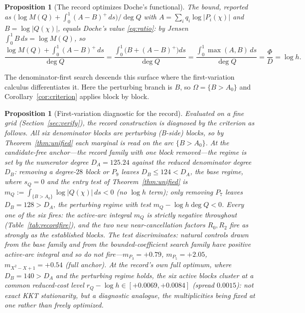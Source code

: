 \documentclass[11pt,reqno]{amsart}
\theoremstyle{plain}
\newtheorem{proposition}[theorem]{Proposition}
\theoremstyle{definition}
\theoremstyle{remark}
\newcommand{\rQ}{r_Q}
\newcommand{\dA}{D_A}
\newcommand{\dB}{D_B}
\begin{document}
\begin{proposition}[The record optimizes Doche's functional]\label{prop:samefunctional}
The \citet{Gri26} bound, reported as
$\bigl(\log M(Q)+\int_0^1(A-B)^+\,ds\bigr)/\deg Q$ with $A=\sum_iq_i\log|P_i(\chi)|$ and
$B=\log|Q(\chi)|$, equals Doche's value \eqref{eq:ratio}: by Jensen
$\int_0^1 B\,ds=\log M(Q)$, so
\begin{equation}\label{eq:samefunctional}
  \frac{\log M(Q)+\int_0^1(A-B)^+\,ds}{\deg Q}
  =\frac{\int_0^1\bigl(B+(A-B)^+\bigr)ds}{\deg Q}
  =\frac{\int_0^1\max(A,B)\,ds}{\deg Q}=\frac{\Phi}{D}=\log h.
\end{equation}
\end{proposition}

The denominator-first search descends this surface where the first-variation calculus
differentiates it. Here the perturbing branch is $B$, so $\Omega=\{B>A_0\}$ and
Corollary~\ref{cor:criterion} applies block by block.

\begin{proposition}[First-variation diagnostic for the record]\label{thm:record-fires}
Evaluated on a fine grid (Section~\ref{sec:verify}), the record construction is
diagnosed by the criterion as follows. All six denominator blocks are \emph{perturbing}
(B-side) blocks, so by Theorem~\ref{thm:unified} each marginal is read on the arc
$\{B>A_0\}$. At the candidate-free anchor---the record family with one block removed---the
regime is set by the numerator degree $\dA=125.24$ against the reduced denominator degree
$\dB$: removing a degree-$28$ block or $P_9$ leaves $\dB\le124<\dA$, the \emph{base}
regime, where $s_Q=0$ and the entry test of Theorem~\ref{thm:unified} is
$m_Q:=\int_{\{B>A_0\}}\log|Q(\chi)|\,ds<0$ (no $\log h$ term); only removing $P_7$ leaves
$\dB=128>\dA$, the perturbing regime with test $m_Q-\log h\deg Q<0$. Every one of the six
fires: the active-arc integral $m_Q$ is strictly negative throughout
(Table~\ref{tab:recordfire}), and the two new near-cancellation factors $R_0,R_2$ fire as
strongly as the established blocks. The test discriminates: natural controls drawn from
the base family and from the bounded-coefficient search family have \emph{positive}
active-arc integral and so do not fire---$m_{P_3}=+0.79$, $m_{P_5}=+2.05$,
$m_{X^2-X+1}=+0.54$ (full anchor). At the record's own \emph{full} optimum, where
$\dB=140>\dA$ and the perturbing regime holds, the six active blocks cluster at a common
reduced-cost level $\rQ-\log h\in[+0.0069,+0.0084]$ (spread $0.0015$): not exact KKT
stationarity, but a diagnostic analogue, the multiplicities being fixed at one rather
than freely optimized.
\end{proposition}
\end{document}
